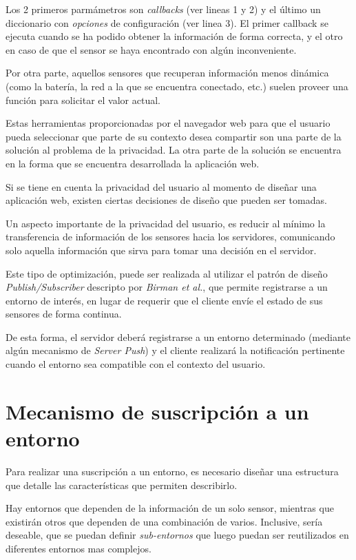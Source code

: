 Los 2 primeros parmámetros son \emph{callbacks} (ver lineas 1 y 2) y el último un diccionario con \emph{opciones} de configuración (ver linea 3). El primer callback se ejecuta cuando se ha podido obtener la información de forma correcta, y el  otro en caso de que el sensor se haya encontrado con algún inconveniente.

Por otra parte, aquellos sensores que recuperan información menos dinámica (como la batería, la red a la que se encuentra conectado, etc.) suelen proveer una función para solicitar el valor actual.

Estas herramientas proporcionadas por el navegador web para que el usuario pueda seleccionar que parte de su contexto desea compartir son una parte de la solución al problema de la privacidad. La otra parte de la solución se encuentra en la forma que se encuentra desarrollada la aplicación web.

Si se tiene en cuenta la privacidad del usuario al momento de diseñar una aplicación web, existen ciertas decisiones de diseño que pueden ser tomadas.

Un aspecto importante de la privacidad del usuario, es reducir al mínimo la transferencia de información de los sensores hacia los servidores, comunicando solo aquella información que sirva para tomar una decisión en el servidor.

Este tipo de optimización, puede ser realizada al utilizar el patrón de diseño \emph{Publish/Subscriber} descripto por \emph{Birman et al.}\cite{Birman87}, que permite registrarse a un entorno de interés, en lugar de requerir que el cliente envíe el estado de sus sensores de forma continua.

De esta forma, el servidor deberá registrarse a un entorno determinado (mediante algún mecanismo de \emph{Server Push}) y el cliente realizará la notificación pertinente cuando el entorno sea compatible con el contexto del usuario.


\section{Mecanismo de suscripción a un entorno}

Para realizar una suscripción a un entorno, es necesario diseñar una estructura que detalle las características que permiten describirlo.

Hay entornos que dependen de la información de un solo sensor, mientras que existirán otros que dependen de una combinación de varios. Inclusive, sería deseable, que se puedan definir \emph{sub-entornos} que luego puedan ser reutilizados en diferentes entornos mas complejos.


